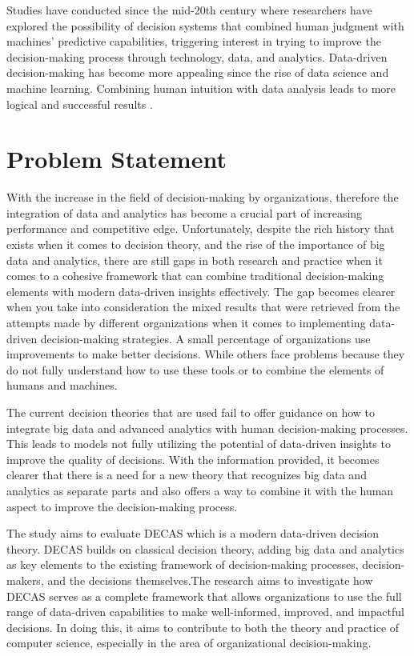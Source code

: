 Studies have conducted since the mid-20th century where researchers have explored the possibility of decision systems that combined human judgment with machines’ predictive capabilities, triggering interest in trying to improve the decision-making process through technology, data, and analytics. Data-driven decision-making has become more appealing since the rise of data science and machine learning. Combining human intuition with data analysis leads to more logical and successful results \cite{DECAS}.

\section{Problem Statement}

With the increase in the field of decision-making by organizations, therefore the integration of data and analytics has become a crucial part of increasing performance and competitive edge. Unfortunately, despite the rich history that exists when it comes to decision theory, and the rise of the importance of big data and analytics, there are still gaps in both research and practice when it comes to a cohesive framework that can combine traditional decision-making elements with modern data-driven insights effectively. The gap becomes clearer when you take into consideration the mixed results that were retrieved from the attempts made by different organizations when it comes to implementing data-driven decision-making strategies. A small percentage of organizations use improvements to make better decisions. While others face problems because they do not fully understand how to use these tools or to combine the elements of humans and machines.

The current decision theories that are used fail to offer guidance on how to integrate big data and advanced analytics with human decision-making processes. This leads to models not fully utilizing the potential of data-driven insights to improve the quality of decisions. With the information provided, it becomes clearer that there is a need for a new theory that recognizes big data and analytics as separate parts and also offers a way to combine it with the human aspect to improve the decision-making process.

The study aims to evaluate DECAS which is a modern data-driven decision theory. DECAS builds on classical decision theory, adding big data and analytics as key elements to the existing framework of decision-making processes, decision-makers, and the decisions themselves.The research aims to investigate how DECAS serves as a complete framework that allows organizations to use the full range of data-driven capabilities to make well-informed, improved, and impactful decisions. In doing this, it aims to contribute to both the theory and practice of computer science, especially in the area of organizational decision-making.



